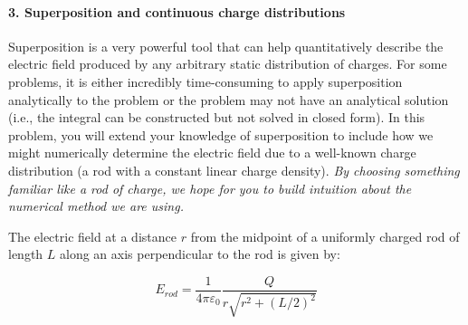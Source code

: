 \documentclass[11pt]{article}
\begin{document}
\paragraph{3. Superposition and continuous charge
distributions}\label{superposition-and-continuous-charge-distributions}

Superposition is a very powerful tool that can help quantitatively
describe the electric field produced by any arbitrary static
distribution of charges. For some problems, it is either incredibly
time-consuming to apply superposition analytically to the problem or the
problem may not have an analytical solution (i.e., the integral can be
constructed but not solved in closed form). In this problem, you will
extend your knowledge of superposition to include how we might
numerically determine the electric field due to a well-known charge
distribution (a rod with a constant linear charge density). \emph{By
choosing something familiar like a rod of charge, we hope for you to
build intuition about the numerical method we are using.}

The electric field at a distance \(r\) from the midpoint of a uniformly
charged rod of length \(L\) along an axis perpendicular to the rod is
given by:

\[E_{rod}=\frac{1}{4\pi\varepsilon_0}\frac{Q}{r\sqrt{r^2+(L/2)^2}}\]
\end{document}
